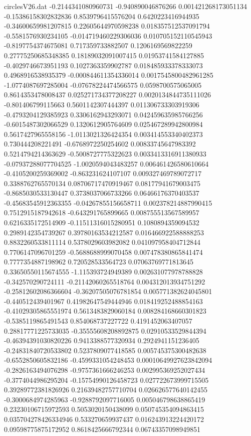 \begin{filecontents}{circlesV26.dat}
-0.2144341080960731	-0.940890046876266	0.001421268173051134
-0.15386158302832836	0.8539796415576204	0.6420223416944935
-0.34600659981207815	0.22605644970598238	0.018357512537091794
-0.5581576930234105	-0.014719460229306036	0.010705152110545943
-0.8197754374675081	0.717359733882507	0.1206169569822259
0.27775250685348385	0.18189032091007415	0.01953741584127885
-0.4029746673951193	0.1027363359902787	0.018485933378333073
0.4968916538935379	-0.000844611354336014	0.0017545800482961285
-1.0774087697285004	-0.07678224474566575	0.0598700575065005
0.8614353478008437	0.025271734377208227	0.0020134844735111026
-0.801406799115663	0.5601142307444397	0.011306733303919306
-0.4793204129385923	0.3306162943293071	0.042459635985766256
-0.6015487302066529	0.1320612905764609	0.025467289942800984
0.5617427965558156	-1.0113021326424354	0.003414553340402373
0.730444208221491	-0.6768972250254602	0.00833745647983392
0.5214794214363629	-0.5008727775322623	0.0033413316911380933
-0.07937288077704525	-1.0020594043483257	0.006461426580610664
-0.4105200259369002	-0.863231624107107	0.009327469789072717
0.3388762765570134	0.08706717470919467	0.08177941679003475
-0.8685030533130447	0.3738037066733266	0.06466176370403537
-0.45683545912363355	-0.04267855156658711	0.002378214887990415
0.7512915187942618	-0.643291765899665	0.008755513567589957
0.6216335172514909	-0.11511316015280951	0.1080894359094532
0.2989142354739267	0.39780163534212587	0.016466922588888253
0.8832260533811114	0.5378029603982082	0.041097958404712844
0.7706147096701259	-0.5688688999070458	0.007478380865841474
0.7777354887198962	0.720528533564723	0.07063769771813645
0.33650550115674555	-1.115393724949389	0.002631077978788828
-0.342570290724111	-0.21142060265518764	0.004312013934751292
-0.25812602086366604	-0.36207505076781854	0.005771382624045801
-0.440512439401967	0.41982647549444946	0.018419252488854163
-0.41029305865551974	0.5613483829060184	0.008284168660301823
-0.5385119865491543	0.854068737227722	0.4191452063407057
0.28817771225733035	-0.35555608208892875	0.02910533529844394
-0.46394391030820226	0.9413388577320934	0.2924941151236405
-0.24831840720533802	0.5237809077418585	0.005745375300482638
-0.6552850605832186	-0.4599331054248453	0.00010649927623842094
-0.2826163494076298	-0.9757361666246253	0.002995369252027434
-0.3774044986295204	-0.15754990126458723	0.027722673999715505
0.39289772381826926	0.21639482757710704	0.026626577640142455
-0.3000684974285963	-0.9288792097716005	0.005046798638865419
0.23230106715972593	0.5053020150438099	0.050745354094863415
0.035704278426334946	0.533270659937437	0.016243913224420172
0.09598775875172952	0.8618425666792344	0.06743357098949851

\end{filecontents}
